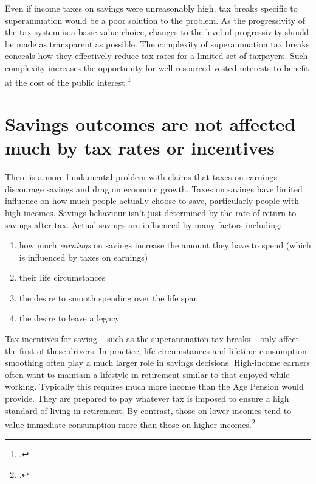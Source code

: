 \documentclass{grattanAlpha}
\begin{document}
Even if income taxes on savings were unreasonably high, tax breaks specific to superannuation would be a poor solution to the problem. As the progressivity of the tax system is a basic value choice, changes to the level of progressivity should be made as transparent as possible. The complexity of superannuation tax breaks conceals how they effectively reduce tax rates for a limited set of taxpayers. Such complexity increases the opportunity for well-resourced vested interests to benefit at the cost of the public interest.\footcite{Teles2013}  

\section{Savings outcomes are not affected much by tax rates or incentives}\label{sec:SUPER-2-6}
There is a more fundamental problem with claims that taxes on earnings discourage savings and drag on economic growth. Taxes on savings have limited influence on how much people actually choose to save, particularly people with high incomes. Savings behaviour isn’t just determined by the rate of return to savings after tax. Actual savings are influenced by many factors including:
\begin{enumerate}
\item how much \emph{earnings} on savings increase the amount they have to spend (which is influenced by taxes on earnings)
\item their life circumstances
\item the desire to smooth spending over the life span
\item the desire to leave a legacy
\end{enumerate}
Tax incentives for saving -- such as the superannuation tax breaks -- only affect the first of these drivers. In practice, life circumstances and lifetime consumption smoothing often play a much larger role in savings decisions. High-income earners often want to maintain a lifestyle in retirement similar to that enjoyed while working. Typically this requires much more income than the Age Pension would provide. They are prepared to pay whatever tax is imposed to ensure a high standard of living in retirement. By contrast, those on lower incomes tend to value immediate consumption more than those on higher incomes.\footcite{DynanSkinnerZeldes2004}  
\end{document}
